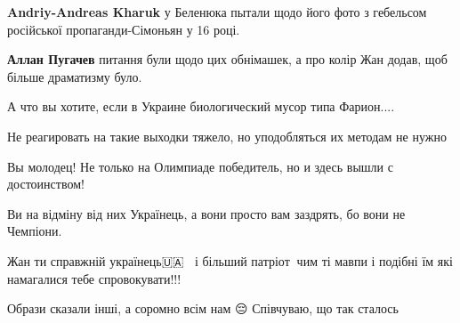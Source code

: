 \begin{itemize}
\begin{itemize}
\textbf{Andriy-Andreas Kharuk} у Беленюка пытали щодо його фото з гебельсом російської пропаганди-Сімоньян у 16 році.

 
\textbf{Аллан Пугачев} питання були щодо цих обнімашек, а про колір Жан додав, щоб більше драматизму було.

\end{itemize}

 

А что вы хотите, если в Украине биологический мусор типа Фарион....

Не реагировать на такие выходки тяжело, но уподобляться их методам не нужно

Вы молодец! Не только на Олимпиаде победитель, но и здесь вышли с достоинством!


 
Ви на відміну від них Українець, а вони просто вам заздрять, бо вони не Чемпіони.

 
Жан ти справжній українець🇺🇦👍🏻 і більший патріот💪🏻чим ті мавпи і подібні їм які намагалися тебе спровокувати!!!

 
Образи сказали інші, а соромно всім нам 😔 Співчуваю, що так сталось


\end{itemize}

